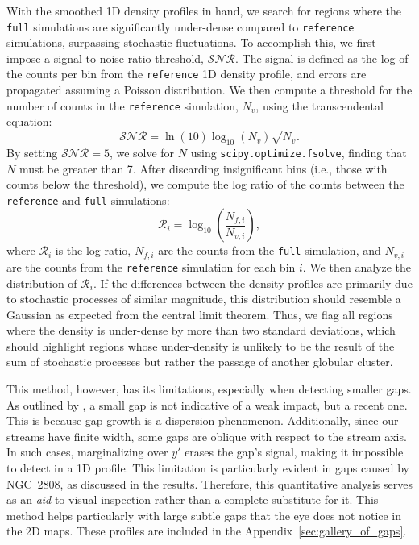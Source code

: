 \documentclass{aa}
\begin{document}
\begin{appendix}
    With the smoothed 1D density profiles in hand, we search for regions where the \texttt{full} simulations are significantly under-dense compared to \texttt{reference} simulations, surpassing stochastic fluctuations. To accomplish this, we first impose a signal-to-noise ratio threshold, $\mathcal{SNR}$. The signal is defined as the log of the counts per bin from the \texttt{reference} 1D density profile, and errors are propagated assuming a Poisson distribution. We then compute a threshold for the number of counts in the \texttt{reference} simulation, $N_v$, using the transcendental equation:
    \begin{equation}
        \mathcal{SNR} = \ln(10) \log_{10}\left(N_v\right) \sqrt{N_v}.
      \end{equation} \label{eq:density_threshold}
    By setting $\mathcal{SNR} = 5$, we solve for $N$ using \texttt{scipy.optimize.fsolve}, finding that $N$ must be greater than 7. After discarding insignificant bins (i.e., those with counts below the threshold), we compute the log ratio of the counts between the \texttt{reference} and \texttt{full} simulations:
    \begin{equation}
        \mathcal{R}_i = \log_{10}\left(\frac{N_{f,i}}{N_{v,i}}\right),
      \end{equation}
    where $\mathcal{R}_i$ is the log ratio, $N_{f,i}$ are the counts from the \texttt{full} simulation, and $N_{v,i}$ are the counts from the \texttt{reference} simulation for each bin $i$. We then analyze the distribution of $\mathcal{R}_i$. If the differences between the density profiles are primarily due to stochastic processes of similar magnitude, this distribution should resemble a Gaussian as expected from the central limit theorem. Thus, we flag all regions where the density is under-dense by more than two standard deviations, which should highlight regions whose under-density is unlikely to be the result of the sum of stochastic processes but rather the passage of another globular cluster. 

    This method, however, has its limitations, especially when detecting smaller gaps. As outlined by \citet{2015MNRAS.450.1136E}, a small gap is not indicative of a weak impact, but a recent one. This is because gap growth is a dispersion phenomenon. Additionally, since our streams have finite width, some gaps are oblique with respect to the stream axis. In such cases, marginalizing over $y'$ erases the gap's signal, making it impossible to detect in a 1D profile. This limitation is particularly evident in gaps caused by NGC~2808, as discussed in the results. Therefore, this quantitative analysis serves as an \textit{aid} to visual inspection rather than a complete substitute for it. This method helps particularly with large subtle gaps that the eye does not notice in the 2D maps. These profiles are included in the Appendix~\ref{sec:gallery_of_gaps}.



\end{appendix}
\end{document}
